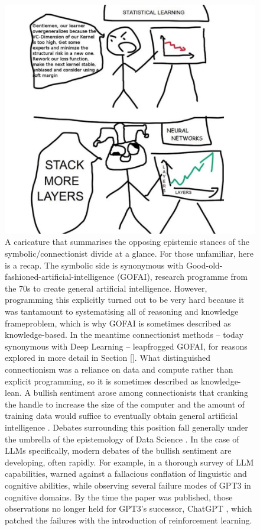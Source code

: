 \begin{figure}
\centering
\includegraphics[width=\textwidth]{figures/intro/stackmoar.jpg}
\caption{
A caricature \citep{deleted_user_stack_2018} that summarises the opposing epistemic stances of the symbolic/connectionist divide at a glance. For those unfamiliar, here is a recap. The symbolic side is synonymous with Good-old-fashioned-artificial-intelligence (GOFAI), research programme from the 70s to create general artificial intelligence. However, programming this explicitly turned out to be very hard because it was tantamount to systematising all of reasoning and knowledge \citep{}frameproblem, which is why GOFAI is sometimes described as knowledge-based. In the meantime connectionist methods -- today synonymous with Deep Learning \citep{} -- leapfrogged GOFAI, for reasons explored in more detail in Section \ref{}. What distinguished connectionism was a reliance on data and compute rather than explicit programming, so it is sometimes described as knowledge-lean. A bullish sentiment arose among connectionists that cranking the handle to increase the size of the computer and the amount of training data would suffice to eventually obtain general artificial intelligence \citep{anderson_end_2008}. Debates surrounding this position fall generally under the umbrella of the epistemology of Data Science \citep{pietsch_epistemology_2022,desai_epistemological_2022}. In the case of LLMs specifically, modern debates of the bullish sentiment are developing, often rapidly. For example, in a thorough survey of LLM capabilities, \citep{} warned against a fallacious conflation of linguistic and cognitive abilities, while observing several failure modes of GPT3 in cognitive domains. By the time the paper was published, those observations no longer held for GPT3's successor, ChatGPT \citep{}, which patched the failures with the introduction of reinforcement learning.
}
\end{figure}
 
